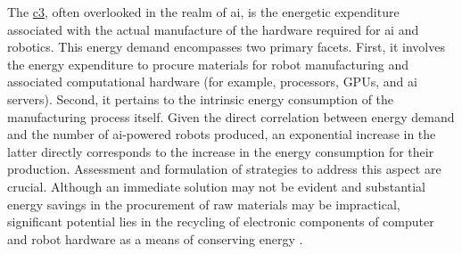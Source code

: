\documentclass[12pt]{article}
\begin{document}
The \underline{\ac{c3}}, often overlooked in the realm of \ac{ai}, is the energetic expenditure associated with the actual manufacture of the hardware required for \ac{ai} and robotics. This energy demand encompasses two primary facets. First, it involves the energy expenditure to procure materials for robot manufacturing and associated computational hardware (for example, processors, GPUs, and \ac{ai} servers). Second, it pertains to the intrinsic energy consumption of the manufacturing process itself. Given the direct correlation between energy demand and the number of \ac{ai}-powered robots produced, an exponential increase in the latter directly corresponds to the increase in the energy consumption for their production. Assessment and formulation of strategies to address this aspect are crucial. Although an immediate solution may not be evident and substantial energy savings in the procurement of raw materials may be impractical, significant potential lies in the recycling of electronic components of computer and robot hardware as a means of conserving energy \cite{Ude2025Recycling}.

\end{document}
